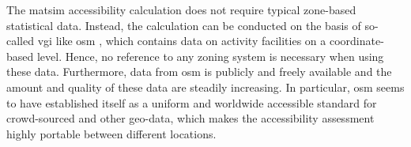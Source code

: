 The \gls{matsim} accessibility calculation does not require typical zone-based statistical data. Instead, the
calculation can be conducted on the basis of so-called \gls{vgi} like \gls{osm}
, which contains data on activity facilities on a coordinate-based level. Hence, no reference to any zoning
system is necessary when using these data. Furthermore, data from \gls{osm} is publicly and freely available 
and the amount and quality of these data are steadily increasing. In particular, \gls{osm} seems to have 
established itself as a uniform and worldwide accessible standard for crowd-sourced and other geo-data, 
which makes the accessibility assessment highly portable between different locations.

%
